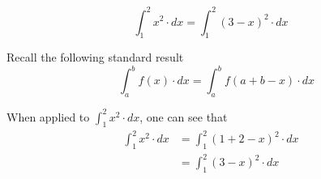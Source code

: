 \documentclass[14pt,fleqn]{extarticle}
\begin{document}
\begin{snippet}
    \correct
    
\[ \int_1^2 x^2\cdot dx = \int_1^2 (3-x)^2\cdot dx \]    

    \reason

Recall the following standard result 
\[ \quad \int_a^b f(x)\cdot dx = \int_a^b f(a+b-x)\cdot dx \]

When applied to $\int_1^2 x^2\cdot dx$, one can see that 
\begin{align}
	\int_1^2 x^2\cdot dx &= \int_1^2 \left(1+2-x \right)^2\cdot dx  \\
	&= \int_1^2 \left(3-x \right)^2\cdot dx 
\end{align}
    
\end{snippet} 
\end{document}
